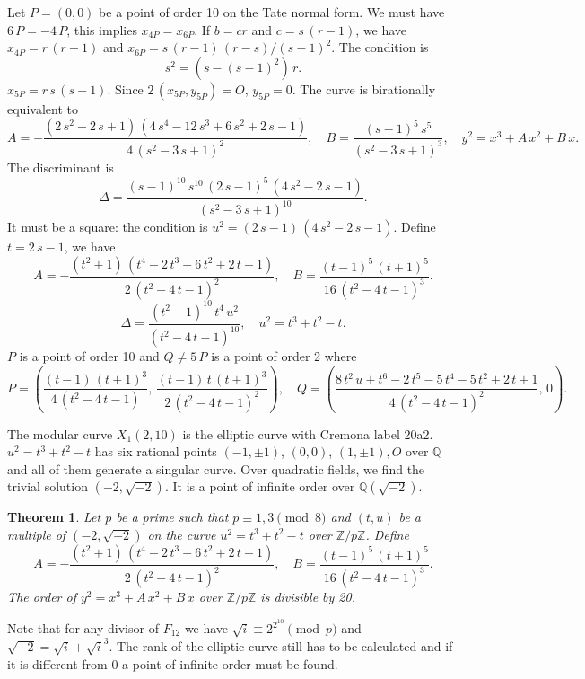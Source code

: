 \documentclass[a4paper, 11pt, pdftex]{report}
\theoremstyle{plain}
\newtheorem{theorem}{Theorem}[chapter]
\theoremstyle{definition}
\begin{document}
Let $P = (0, 0)$ be a point of order 10 on the Tate normal form. We must have $6\,P = -4\,P$,
this implies $x_{4P} = x_{6P}$. If $b = cr$ and $c = s\,(r - 1)$,
we have $x_{4P} = r\,(r - 1)$ and $x_{6P} = s\,(r - 1)\,(r - s) / (s - 1)^2$.
The condition is
$$s^2 = (s - (s - 1)^2)\,r.$$
$x_{5P} = r\,s\,(s - 1)$. Since $2\,(x_{5P}, y_{5P}) = O$, $y_{5P} = 0$. The curve is 
birationally equivalent to
$$A = -\frac{(2\,s^2 - 2\,s + 1)\,(4\,s^4 - 12\,s^3 + 6\,s^2 + 2\,s - 1)}{4\,(s^2 - 3\,s + 1)^2},\quad
B = \frac{(s - 1)^5\, s^5}{(s^2 - 3\,s + 1)^3},\quad y^2 = x^3 + A\,x^2 + B\,x.$$
The discriminant is
$$\Delta = \frac{(s-1)^{10}\,s^{10}\,(2\,s - 1)^5\,(4\,s^2 - 2\,s - 1)}{(s^2 - 3\,s + 1)^{10}}.$$
It must be a square: the condition is $u^2 = (2\,s - 1)\,(4\,s^2 - 2\,s - 1)$.
Define $t = 2\,s - 1$, we have
$$A = -\frac{(t^2 + 1)\,(t^4 - 2\,t^3 - 6 \,t^2 + 2\,t + 1)}{2\,(t^2 - 4\,t - 1)^2},\quad
B = \frac{(t - 1)^5\,(t + 1)^5}{16\,(t^2 - 4\,t - 1)^3}.$$
$$\Delta = \frac{(t^2 - 1)^{10}\,t^4\,u^2}{(t^2 - 4\,t - 1)^{10}},\quad
u^2 = t^3 + t^2 - t.$$
$P$ is a point of order 10 and $Q \neq 5\,P$ is a point of order 2 where
$$P = \left(\frac{(t - 1)\,(t + 1)^3}{4\,(t^2 - 4\,t - 1)},\,
            \frac{(t - 1)\,t\,(t + 1)^3}{2\,(t^2 - 4\,t - 1)^2}\right),\quad
  Q = \left(\frac{8\,t^2\,u + t^6 - 2\,t^5 - 5\,t^4 - 5\,t^2 + 2\,t + 1}
                 {4\,(t^2 - 4\,t - 1)^2},\, 0\right).$$

The modular curve $X_1(2, 10)$ is the elliptic curve with Cremona label 20a2.
$u^2 = t^3 + t^2 - t$ has six rational points $(-1, \pm1)$, $(0, 0)$, $(1, \pm1), O$
over $\mathbb{Q}$ and all of them generate a singular curve.
Over quadratic fields, we find the trivial solution $(-2, \sqrt{-2})$. It is a point of
infinite order over $\mathbb{Q}(\sqrt{-2})$.

\begin{theorem}
Let $p$ be a prime such that $p \equiv 1, 3 \pmod{8}$ and $(t, u)$ be a multiple
of $(-2, \sqrt{-2})$ on the curve $u^2 = t^3 + t^2 - t$ over $\mathbb{Z}/p\mathbb{Z}$.
Define
$$A = -\frac{(t^2 + 1)\,(t^4 - 2\,t^3 - 6 \,t^2 + 2\,t + 1)}{2\,(t^2 - 4\,t - 1)^2},\quad
B = \frac{(t - 1)^5\,(t + 1)^5}{16\,(t^2 - 4\,t - 1)^3}.$$
The order of $y^2 = x^3 + A\,x^2 + B\,x$ over $\mathbb{Z}/p\mathbb{Z}$ is divisible by 20.
\end{theorem}
Note that for any divisor of $F_{12}$ we have $\sqrt{i} \equiv 2^{2^{10}} \pmod{p}$ and
$\sqrt{-2} = \sqrt{i} + \sqrt{i}^3$.
The rank of the elliptic curve still has to be calculated and if it is different from 0
a point of infinite order must be found.
\end{document}

